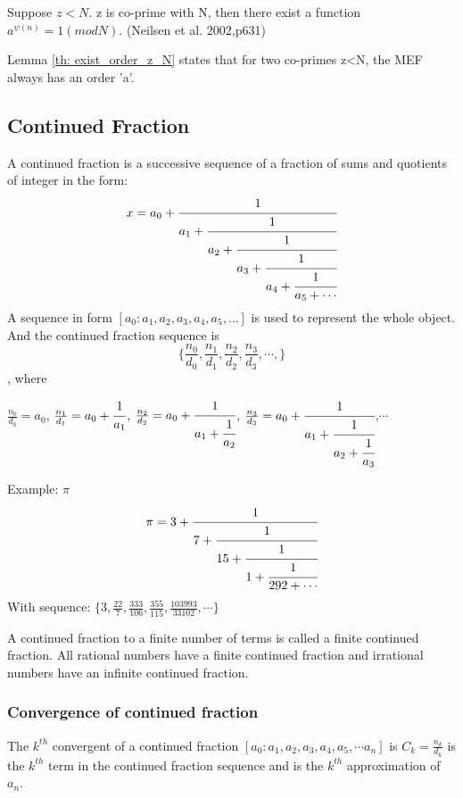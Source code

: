 \begin{lemma}
    Suppose $z<N$. z is co-prime with N, then there exist a function $a^{\psi(n)} =1 (mod N)$. \cite{Nielsen2002}(Neilsen et al. 2002,p631)
    \label{th: exist_order_z_N}
\end{lemma}
Lemma \ref{th: exist_order_z_N} states that for two co-primes z<N, the \acrshort{MEF} always has an order 'a'. 

\subsection{Continued Fraction}
A continued fraction is a successive sequence of a fraction of sums and quotients of integer in the form:
\begin{equation*}
   x = a_0+\cfrac{1}{a_1+\cfrac{1}{a_2+\cfrac{1}{ a_3+\cfrac{1}{a_4+\cfrac{1}{a_5+\cdots}}}}}
\end{equation*}
A sequence in form $[a_0:a_1,a_2,a_3,a_4, a_5, \dots ]$ is used to represent the whole object. And the continued fraction sequence is $$\{\frac{n_0}{d_0}, \frac{n_1}{d_1}, \frac{n_2}{d_2}, \frac{n_3}{d_3}, \cdots,\}$$, where 

$\frac{n_0}{d_0} = a_0$, $\frac{n_1}{d_1} = a_0+\cfrac{1}{a_1}$, $\frac{n_2}{d_2} = a_0+\cfrac{1}{a_1+\cfrac{1}{a_2}}$, $\frac{n_3}{d_3} = a_0+\cfrac{1}{a_1+\cfrac{1}{a_2+\cfrac{1}{ a_3}}}$,$\cdots$

Example: $\pi$
\begin{equation*}
    \pi = 3+\cfrac{1}{7+\cfrac{1}{15+\cfrac{1}{1+\cfrac{1}{292+\cdots}}}}
\end{equation*}
With sequence: $\{3,\frac{22}{7}, \frac{333}{106},\frac{355}{115},\frac{103993}{33102}, \cdots \}$

A continued fraction to a finite number of terms is called a finite continued fraction. All rational numbers have a finite continued fraction and irrational numbers have an infinite continued fraction.
\subsubsection{Convergence of continued fraction}
The $k^{th}$ convergent of a continued fraction $[a_0:a_1,a_2,a_3,a_4, a_5, \cdots a_n]$ is 
$C_k = \frac{n_k}{d_k}$ is the $k^{th}$ term in the continued fraction sequence and is the $k^{th}$ approximation of $a_n$.\cite{burton2011}

